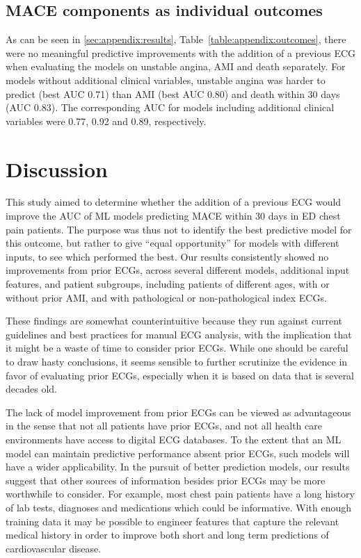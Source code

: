 \documentclass[preprint]{elsarticle}
\begin{document}
\subsection{MACE components as individual outcomes}
As can be seen in \ref{sec:appendix:results}, Table~\ref{table:appendix:outcomes}, there were no meaningful predictive improvements with the addition of a previous ECG when evaluating the models on unstable angina, AMI and death separately. For models without additional clinical variables, unstable angina was harder to predict (best AUC 0.71) than AMI (best AUC 0.80) and death within 30 days (AUC 0.83). The corresponding AUC for models including additional clinical variables were 0.77, 0.92 and 0.89, respectively. 

\section{Discussion}
This study aimed to determine whether the addition of a previous ECG would improve the AUC of ML models predicting MACE within 30 days in ED chest pain patients. The purpose was thus not to identify the best predictive model for this outcome, but rather to give ``equal opportunity'' for models with different inputs, to see which performed the best. Our results consistently showed no improvements from prior ECGs, across several different models, additional input features, and patient subgroups, including patients of different ages, with or without prior AMI, and with pathological or non-pathological index ECGs.

These findings are somewhat counterintuitive because they run against current guidelines and best practices for manual ECG analysis, with the implication that it might be a waste of time to consider prior ECGs. While one should be careful to draw hasty conclusions, it seems sensible to further scrutinize the evidence in favor of evaluating prior ECGs, especially when it is based on data that is several decades old.

The lack of model improvement from prior ECGs can be viewed as advantageous in the sense that not all patients have prior ECGs, and not all health care environments have access to digital ECG databases. To the extent that an ML model can maintain predictive performance absent prior ECGs, such models will have a wider applicability. In the pursuit of better prediction models, our results suggest that other sources of information besides prior ECGs may be more worthwhile to consider. For example, most chest pain patients have a long history of lab tests, diagnoses and medications which could be informative. With enough training data it may be possible to engineer features that capture the relevant medical history in order to improve both short and long term predictions of cardiovascular disease. 
\end{document}
